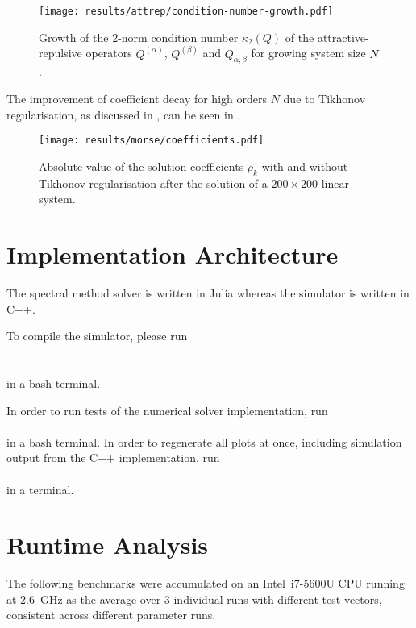 \begin{figure}[H]
  \centering
  \texttt{[image: results/attrep/condition-number-growth.pdf]}
  \caption[Growth of the condition number]{Growth of the 2-norm condition number $\kappa_2(Q)$ of the attractive-repulsive operators $Q^{(\alpha)}$, $Q^{(\beta)}$ and $Q_{\alpha,\beta}$ for growing system size $N$.}
  \label{fig:condition-number-growth}
\end{figure}

The improvement of coefficient decay for high orders $N$ due to Tikhonov regularisation, as discussed in , can be seen in .

\begin{figure}[H]
  \centering
  \texttt{[image: results/morse/coefficients.pdf]}
  \caption[Absolute value of the coefficients with and without regularisation]{Absolute value of the solution coefficients $\rho_k$ with and without Tikhonov regularisation after the solution of a $200 \times 200$ linear system.}
  \label{fig:coefficients}
\end{figure}

\section{Implementation Architecture}
The spectral method solver is written in Julia \parencite{2017-julia} whereas the simulator is written in C++.

To compile the simulator, please run \\
 \\
 \\
in a bash terminal.

In order to run tests of the numerical solver implementation, run \\
 \\
in a bash terminal. In order to regenerate all plots at once, including simulation output from the C++ implementation, run \\
 \\
in a terminal.

\section{Runtime Analysis}
\label{sec:runtime-analysis}
The following benchmarks were accumulated on an Intel\textregistered \, i7-5600U CPU running at \SI{2.6}{\giga\hertz} as the average over 3 individual runs with different test vectors, consistent across different parameter runs.
